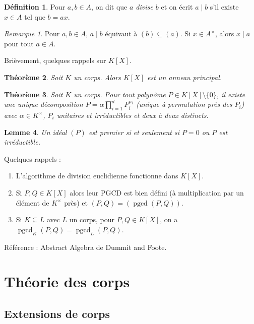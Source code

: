 \documentclass{article}
\DeclareMathOperator{\pgcd}{pgcd}
\theoremstyle{plain}
\newtheorem{theorem}{Théorème}[section]
\newtheorem{lemma}[theorem]{Lemme}
\theoremstyle{definition}
\newtheorem{definition}[theorem]{Définition}
\theoremstyle{remark}
\newtheorem*{remark}{Remarque}
\begin{document}
\begin{definition}
    Pour $a,b \in A$, on dit que \emph{$a$ divise $b$} et on écrit $a \mid b$ s'il existe $x\in A$ tel que $b = ax$.
\end{definition}

\begin{remark}
    Pour $a,b \in A$, $a \mid b$ équivaut à $(b) \subseteq (a)$. Si $x \in A^\times$, alors $x \mid a$ pour tout $a \in A$.
\end{remark}

Brièvement, quelques rappels sur $K[X]$.

\begin{theorem}
    Soit $K$ un corps. Alors $K[X]$ est un anneau principal.
\end{theorem}

\begin{theorem}
    Soit $K$ un corps. Pour tout polynôme $P \in K[X] \setminus \{0\}$, il existe une unique décomposition $P = \alpha \prod\limits_{i=1}^d P_i^{n_i}$ (unique à permutation près des $P_i$) avec $\alpha \in K^\times$, $P_i$ unitaires et irréductibles et deux à deux distincts.
\end{theorem}

\begin{lemma}
    Un idéal $(P)$ est premier si et seulement si $P = 0$ ou $P$ est irréductible.
\end{lemma}

Quelques rappels :

\begin{enumerate}
    \item L'algorithme de division euclidienne fonctionne dans $K[X]$.
    \item Si $P,Q \in K[X]$ alors leur PGCD est bien défini (à multiplication par un élément de $K^\times$ près) et $(P,Q) = (\pgcd(P,Q))$.
    \item Si $K \subseteq L$ avec $L$ un corps, pour $P,Q \in K[X]$, on a $\pgcd_K(P,Q) = \pgcd_L (P,Q)$.
\end{enumerate}

Référence : Abstract Algebra de Dummit and Foote.

\section{Théorie des corps}

\subsection{Extensions de corps}
\end{document}
